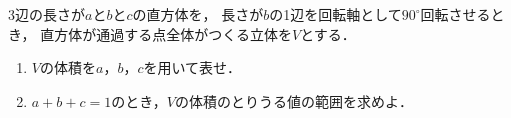 \documentclass[../../main.tex]{subfiles}
\begin{document}
3辺の長さが$a$と$b$と$c$の直方体を，
長さが$b$の1辺を回転軸として${90}^\circ$回転させるとき，
直方体が通過する点全体がつくる立体を$V$とする．
\begin{enumerate}
  \item $V$の体積を$a$，$b$，$c$を用いて表せ．
  \item $a+b+c=1$のとき，$V$の体積のとりうる値の範囲を求めよ．
\end{enumerate}
\end{document}
